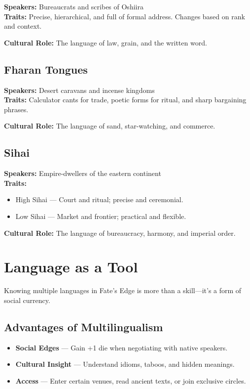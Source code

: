\textbf{Speakers:} Bureaucrats and scribes of Oshiira \\
\textbf{Traits:} Precise, hierarchical, and full of formal address. Changes based on rank and context.

\textbf{Cultural Role:} The language of law, grain, and the written word.

\subsection*{Fharan Tongues}

\textbf{Speakers:} Desert caravans and incense kingdoms \\
\textbf{Traits:} Calculator cants for trade, poetic forms for ritual, and sharp bargaining phrases.

\textbf{Cultural Role:} The language of sand, star-watching, and commerce.

\subsection*{Sihai}

\textbf{Speakers:} Empire-dwellers of the eastern continent \\
\textbf{Traits:} 
\begin{itemize}
  \item High Sihai — Court and ritual; precise and ceremonial.
  \item Low Sihai — Market and frontier; practical and flexible.
\end{itemize}

\textbf{Cultural Role:} The language of bureaucracy, harmony, and imperial order.

\section{Language as a Tool}

Knowing multiple languages in Fate's Edge is more than a skill—it's a form of social currency.

\subsection*{Advantages of Multilingualism}

\begin{itemize}
  \item \textbf{Social Edges} — Gain +1 die when negotiating with native speakers.
  \item \textbf{Cultural Insight} — Understand idioms, taboos, and hidden meanings.
  \item \textbf{Access} — Enter certain venues, read ancient texts, or join exclusive circles.
\end{itemize}

